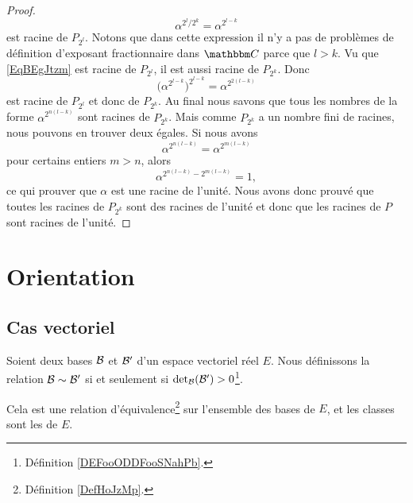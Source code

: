 \begin{proof}
    \begin{equation}    \label{EqBEgJtzm}
        \alpha^{2^l/2^k}=\alpha^{2^{l-k}}
    \end{equation}
    est racine de \( P_{2^l}\). Notons que dans cette expression il n'y a pas de problèmes de définition d'exposant fractionnaire dans \( \eC\) parce que \( l>k\). Vu que \eqref{EqBEgJtzm} est racine de \( P_{2^l}\), il est aussi racine de \( P_{2^k}\). Donc
    \begin{equation}
        \big( \alpha^{2^{l-k}} \big)^{2^{l-k}}=\alpha^{2^{2(l-k)}}
    \end{equation}
    est racine de \( P_{2^l}\) et donc de \( P_{2^k}\). Au final nous savons que tous les nombres de la forme \( \alpha^{2^{n(l-k)}}\) sont racines de \( P_{2^k}\). Mais comme \( P_{2^k}\) a un nombre fini de racines, nous pouvons en trouver deux égales. Si nous avons
    \begin{equation}
        \alpha^{2^{n(l-k)}}=\alpha^{2^{m(l-k)}}
    \end{equation}
    pour certains entiers \( m>n\), alors
    \begin{equation}
        \alpha^{2^{n(l-k)}-2^{m(l-k)}}=1,
    \end{equation}
    ce qui prouver que \( \alpha\) est une racine de l'unité. Nous avons donc prouvé que toutes les racines de \( P_{2^k}\) sont des racines de l'unité et donc que les racines de \( P\) sont racines de l'unité.
\end{proof}

\section{Orientation}

\subsection{Cas vectoriel}

\begin{propositionDef}        \label{DEFooNVRHooEBHUSu}
    Soient deux bases \( \mathcal{B}\) et \( \mathcal{B}'\) d'un espace vectoriel réel \( E\). Nous définissons la relation \( \mathcal{B}\sim \mathcal{B}'\) si et seulement si \( \mathop{\mathrm{det}}\nolimits_{\mathcal{B}}(\mathcal{B}')>0\)\footnote{Définition \ref{DEFooODDFooSNahPb}.}.

    Cela est une relation d'équivalence\footnote{Définition \ref{DefHoJzMp}.} sur l'ensemble des bases de \( E\), et les classes sont les  de \( E\).
\end{propositionDef}

